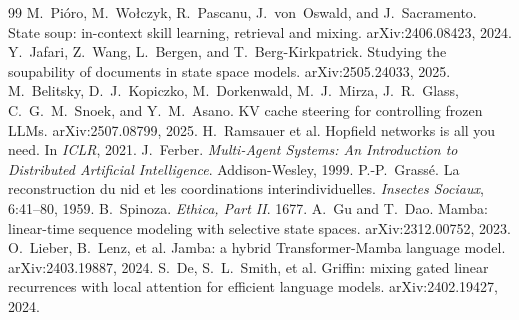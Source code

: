 \documentclass[11pt]{article}
\theoremstyle{definition}
\begin{document}
\begin{thebibliography}{99}
 M.~Pi\'oro, M.~Wo\l czyk, R.~Pascanu, J.~von~Oswald, and J.~Sacramento. State soup: in-context skill learning, retrieval and mixing. arXiv:2406.08423, 2024.
 Y.~Jafari, Z.~Wang, L.~Bergen, and T.~Berg-Kirkpatrick. Studying the soupability of documents in state space models. arXiv:2505.24033, 2025.
 M.~Belitsky, D.~J.~Kopiczko, M.~Dorkenwald, M.~J.~Mirza, J.~R.~Glass, C.~G.~M.~Snoek, and Y.~M.~Asano. KV cache steering for controlling frozen LLMs. arXiv:2507.08799, 2025.
 H.~Ramsauer et al. Hopfield networks is all you need. In \emph{ICLR}, 2021.
 J.~Ferber. \emph{Multi-Agent Systems: An Introduction to Distributed Artificial Intelligence}. Addison-Wesley, 1999.
 P.-P.~Grass\'e. La reconstruction du nid et les coordinations interindividuelles. \emph{Insectes Sociaux}, 6:41--80, 1959.
 B.~Spinoza. \emph{Ethica, Part II}. 1677.
 A.~Gu and T.~Dao. Mamba: linear-time sequence modeling with selective state spaces. arXiv:2312.00752, 2023.
 O.~Lieber, B.~Lenz, et al. Jamba: a hybrid Transformer-Mamba language model. arXiv:2403.19887, 2024.
 S.~De, S.~L.~Smith, et al. Griffin: mixing gated linear recurrences with local attention for efficient language models. arXiv:2402.19427, 2024.
\end{thebibliography}
\end{document}
